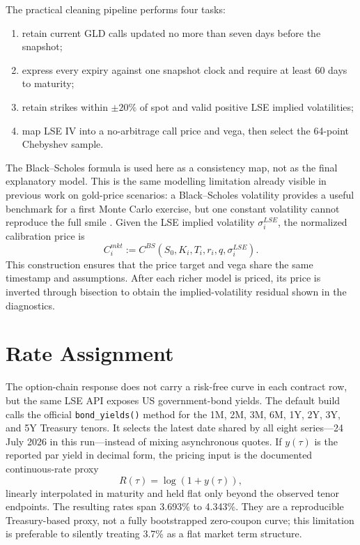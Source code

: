 \documentclass[a4paper,10pt,titlepage,oneside,openany]{book}
\theoremstyle{plain}
\theoremstyle{definition}
\theoremstyle{remark}
\begin{document}
The practical cleaning pipeline performs four tasks:

\begin{enumerate}[leftmargin=8mm, itemsep=2pt]
    \item retain current GLD calls updated no more than seven days before the snapshot;
    \item express every expiry against one snapshot clock and require at least 60 days to maturity;
    \item retain strikes within \(\pm20\%\) of spot and valid positive LSE implied volatilities;
    \item map LSE IV into a no-arbitrage call price and vega, then select the 64-point Chebyshev sample.
\end{enumerate}

The Black--Scholes formula is used here as a consistency map, not as the final explanatory model. This is the same modelling limitation already visible in previous work on gold-price scenarios: a Black--Scholes volatility provides a useful benchmark for a first Monte Carlo exercise, but one constant volatility cannot reproduce the full smile \cite{BarrickArticle4}. Given the LSE implied volatility \(\sigma_i^{LSE}\), the normalized calibration price is
\begin{equation}
    C_i^{mkt}:=C^{BS}(S_0,K_i,T_i,r_i,q,\sigma_i^{LSE}).
\end{equation}
This construction ensures that the price target and vega share the same timestamp and assumptions. After each richer model is priced, its price is inverted through bisection to obtain the implied-volatility residual shown in the diagnostics.

\section{Rate Assignment}

The option-chain response does not carry a risk-free curve in each contract row, but the same LSE API exposes US government-bond yields. The default build calls the official \texttt{bond\_yields()} method for the 1M, 2M, 3M, 6M, 1Y, 2Y, 3Y, and 5Y Treasury tenors. It selects the latest date shared by all eight series---24 July 2026 in this run---instead of mixing asynchronous quotes. If \(y(\tau)\) is the reported par yield in decimal form, the pricing input is the documented continuous-rate proxy
\[
    R(\tau)=\log\!\left(1+y(\tau)\right),
\]
linearly interpolated in maturity and held flat only beyond the observed tenor endpoints. The resulting rates span 3.693\% to 4.343\%. They are a reproducible Treasury-based proxy, not a fully bootstrapped zero-coupon curve; this limitation is preferable to silently treating 3.7\% as a flat market term structure.
\end{document}
